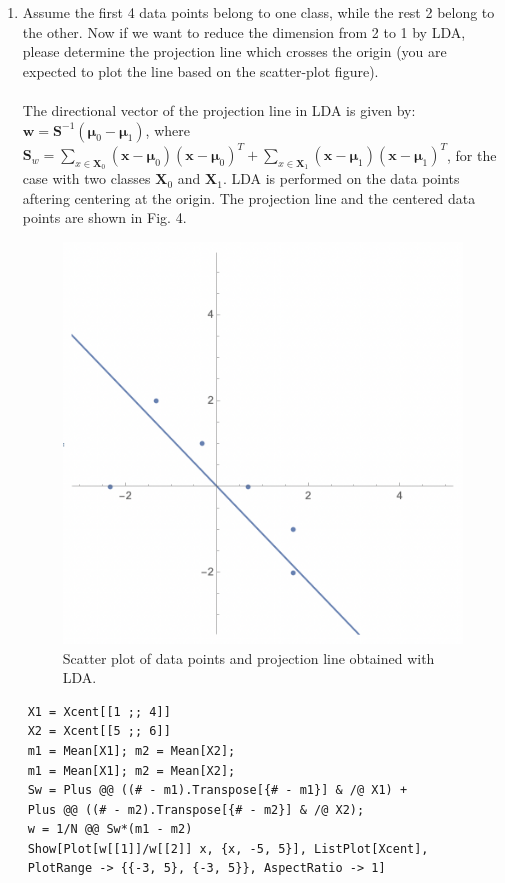 \documentclass[11pt]{article}
\newcommand{\mtx}[1]{\mathbf{#1}}
\newcommand{\vct}[1]{\mathbf{#1}}
\def \mS {\mtx{S}}
\def \mX {\mtx{X}}
\def \vx {\vct{x}}
\def \vmu {\vct{\mu}}
\def \vw {\vct{w}}
\begin{document}
\begin{enumerate}
	\item Assume the first 4 data points belong to one class, while the rest 2 belong to the other. Now if we want to reduce the dimension from 2 to 1 by LDA, please determine the projection line which crosses the origin (you are expected to plot the line based on the scatter-plot figure).\\ \\
	The directional vector of the projection line in LDA is given by: $\vw=\mS^{-1}(\vmu_0-\vmu_1)$, where $\mS_w=\sum_{x\in\mX_0}(\vx-\vmu_0)(\vx-\vmu_0)^T + \sum_{x\in\mX_1}(\vx-\vmu_1)(\vx-\vmu_1)^T$, for the case with two classes $\mX_0$ and $\mX_1$. LDA is performed on the data points aftering centering at the origin. The projection line and the centered data points are shown in Fig. 4.
	\begin{figure}[H] %
		\centering\includegraphics[width=0.6\linewidth]{prob1_lda.png}
		\caption{Scatter plot of data points and projection line obtained with LDA.} %
		\label{fig:fig4}  %
	\end{figure}
\end{enumerate}

\begin{verbatim}
	X1 = Xcent[[1 ;; 4]]
	X2 = Xcent[[5 ;; 6]]
	m1 = Mean[X1]; m2 = Mean[X2];
	m1 = Mean[X1]; m2 = Mean[X2];
	Sw = Plus @@ ((# - m1).Transpose[{# - m1}] & /@ X1) + 
	Plus @@ ((# - m2).Transpose[{# - m2}] & /@ X2);
	w = 1/N @@ Sw*(m1 - m2)
	Show[Plot[w[[1]]/w[[2]] x, {x, -5, 5}], ListPlot[Xcent], 
	PlotRange -> {{-3, 5}, {-3, 5}}, AspectRatio -> 1]
\end{verbatim} \\ \\
\end{document}
